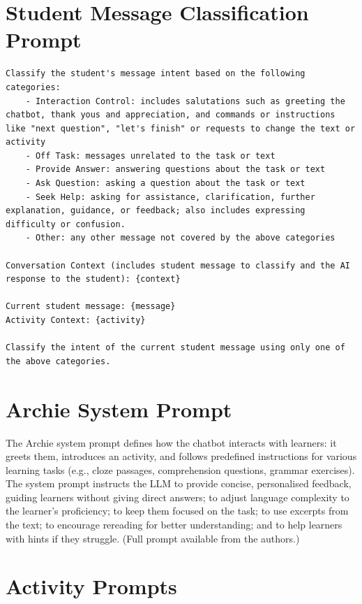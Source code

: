 \section{Student Message Classification Prompt}
\label{app:classification_prompt}

\begin{lstlisting}
Classify the student's message intent based on the following categories:
    - Interaction Control: includes salutations such as greeting the chatbot, thank yous and appreciation, and commands or instructions like "next question", "let's finish" or requests to change the text or activity
    - Off Task: messages unrelated to the task or text
    - Provide Answer: answering questions about the task or text
    - Ask Question: asking a question about the task or text
    - Seek Help: asking for assistance, clarification, further explanation, guidance, or feedback; also includes expressing difficulty or confusion. 
    - Other: any other message not covered by the above categories

Conversation Context (includes student message to classify and the AI response to the student): {context}

Current student message: {message}
Activity Context: {activity}

Classify the intent of the current student message using only one of the above categories.
\end{lstlisting}

\section{Archie System Prompt}
\label{app:archie_prompt}

The Archie system prompt defines how the chatbot interacts with learners: it greets them, introduces an activity, and follows predefined instructions for various learning tasks (e.g., cloze passages, comprehension questions, grammar exercises). The system prompt instructs the LLM to provide concise, personalised feedback, guiding learners without giving direct answers; to adjust language complexity to the learner's proficiency; to keep them focused on the task; to use excerpts from the text; to encourage rereading for better understanding; and to help learners with hints if they struggle. (Full prompt available from the authors.)

\section{Activity Prompts}
\label{app:activity_prompts}

